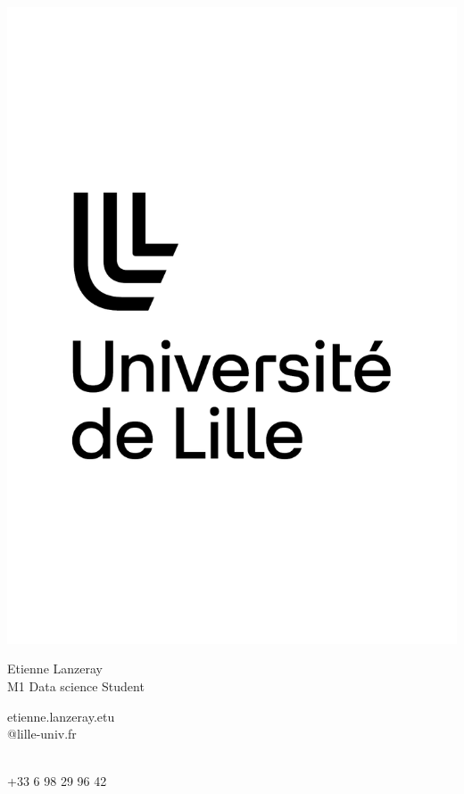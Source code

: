 \documentclass{article}
\begin{document}
\centering \includegraphics[width=.25\linewidth]{logo}\\[5pt]
\parbox{2in}{\Large \centering Etienne Lanzeray\\[1pt]
\normalsize M1 Data science Student}

\vfill
\raggedright
\begin{multicols}{2}
\small etienne.lanzeray.etu \\
\small @lille-univ.fr

\columnbreak
\raggedleft
\hfill \\
\small +33 6 98 29 96 42%
\end{multicols}%
\end{document}
